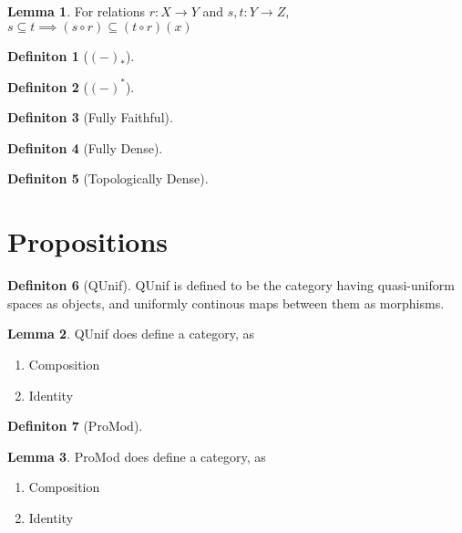 \documentclass[18pt,a4paper]{article}
\theoremstyle{definition}
\newtheorem{definition}{Definiton}[section]
\newtheorem{lemma}{Lemma}[definition]
\begin{document}
	\begin{lemma} For relations $r:X\to Y$ and $s,t:Y\to Z$,
		$s\subseteq t \implies (s \circ r) \subseteq
		(t \circ r)(x)$

	\end{lemma}
	\begin{definition}[$(-)_*$] %

	\end{definition}
	\begin{definition}[$(-)^*$] %

	\end{definition}
	\begin{definition}[Fully Faithful] %

	\end{definition}

	\begin{definition}[Fully Dense] %

	\end{definition}
	\begin{definition}[Topologically Dense] %

	\end{definition}
	\section{Propositions}
	\begin{definition}[QUnif] %
		QUnif is defined to be the category having quasi-uniform spaces as objects, and uniformly continous
		maps between them as morphisms.
	\end{definition}
	\begin{lemma} QUnif does define a category, as
		\begin{enumerate}[label=\roman*]
			\item Composition
			\item Identity
		\end{enumerate}
	\end{lemma}

	\begin{definition}[ProMod] %

	\end{definition}

	\begin{lemma} ProMod does define a category, as
		\begin{enumerate}[label=\roman*]
			\item Composition
			\item Identity
		\end{enumerate}
	\end{lemma}
\end{document}

